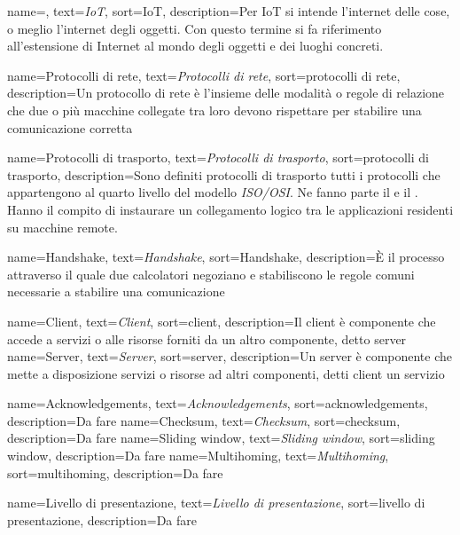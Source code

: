  {
    name=,
    text=\emph{IoT},
    sort=IoT,
    description={Per IoT si intende l'internet delle cose, o meglio l'internet degli oggetti. Con questo termine si fa riferimento all'estensione di Internet al mondo degli oggetti e dei luoghi concreti. }
}

 {
    name=Protocolli di rete,
    text=\emph{Protocolli di rete},
    sort=protocolli di rete,
    description={Un protocollo di rete è l'insieme delle modalità o regole di relazione che due o più macchine collegate tra loro devono rispettare per stabilire una comunicazione corretta}
}

 {
    name=Protocolli di trasporto,
    text=\emph{Protocolli di trasporto},
    sort=protocolli di trasporto,
    description={Sono definiti protocolli di trasporto tutti i protocolli che appartengono al quarto livello del modello \emph{\gls{ISO/OSI}}. Ne fanno parte il  e il . Hanno il compito di instaurare un collegamento logico tra le applicazioni residenti su macchine remote. }
}

 {
    name=Handshake,
    text=\emph{Handshake},
    sort=Handshake,
    description={È il processo attraverso il quale due calcolatori negoziano e stabiliscono le regole comuni necessarie a stabilire una comunicazione}
}

 {
    name=Client,
    text=\emph{Client},
    sort=client,
    description={Il client è componente che accede a servizi o alle risorse forniti da un altro componente, detto \gls{server} }
}
 {
    name=Server,
    text=\emph{Server},
    sort=server,
    description={Un server è componente che mette a disposizione servizi o risorse ad altri componenti, detti \gls{client} un servizio}
}

 {
    name=Acknowledgements,
    text=\emph{Acknowledgements},
    sort=acknowledgements,
    description={Da fare}
}
 {
    name=Checksum,
    text=\emph{Checksum},
    sort=checksum,
    description={Da fare}
}
 {
    name=Sliding window,
    text=\emph{Sliding window},
    sort=sliding window,
    description={Da fare}
}
 {
    name=Multihoming,
    text=\emph{Multihoming},
    sort=multihoming,
    description={Da fare}
}

 {
    name=Livello di presentazione,
    text=\emph{Livello di presentazione},
    sort=livello di presentazione,
    description={Da fare}
}

